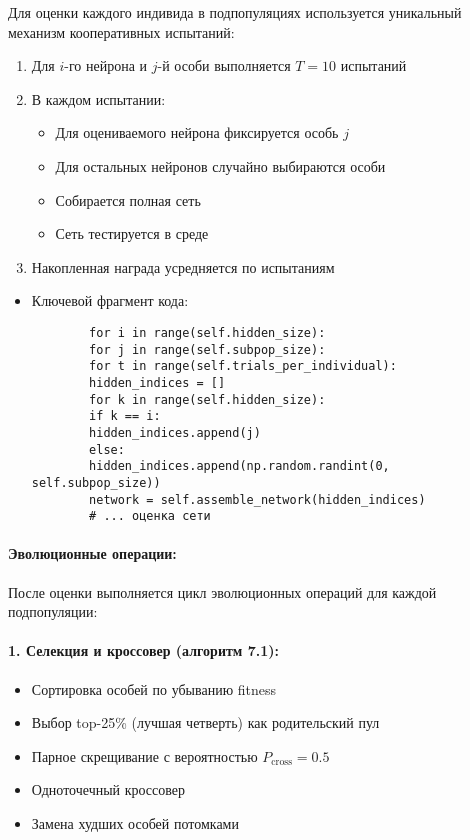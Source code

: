 \documentclass[a4paper,12pt]{article}
\begin{document}
Для оценки каждого индивида в подпопуляциях используется уникальный механизм кооперативных испытаний:
\begin{enumerate}
	\item Для $i$-го нейрона и $j$-й особи выполняется $T=10$ испытаний
	\item В каждом испытании:
	\begin{itemize}
		\item Для оцениваемого нейрона фиксируется особь $j$
		\item Для остальных нейронов случайно выбираются особи
		\item Собирается полная сеть
		\item Сеть тестируется в среде
	\end{itemize}
	\item Накопленная награда усредняется по испытаниям
\end{enumerate}

\begin{itemize}
	\item[] Ключевой фрагмент кода:
	\begin{lstlisting}
		for i in range(self.hidden_size):
		for j in range(self.subpop_size):
		for t in range(self.trials_per_individual):
		hidden_indices = []
		for k in range(self.hidden_size):
		if k == i:
		hidden_indices.append(j)
		else:
		hidden_indices.append(np.random.randint(0, self.subpop_size))
		network = self.assemble_network(hidden_indices)
		# ... оценка сети
	\end{lstlisting}
\end{itemize}

\paragraph{Эволюционные операции:}

После оценки выполняется цикл эволюционных операций для каждой подпопуляции:

\paragraph{1. Селекция и кроссовер (алгоритм 7.1):}
\begin{itemize}
	\item Сортировка особей по убыванию fitness
	\item Выбор top-25\% (лучшая четверть) как родительский пул
	\item Парное скрещивание с вероятностью $P_{\text{cross}}=0.5$
	\item Одноточечный кроссовер
	\item Замена худших особей потомками
\end{itemize}
\end{document}
